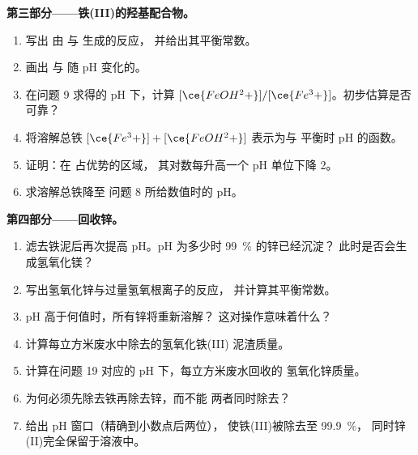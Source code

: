 \begin{problem}
\medskip
\noindent\textbf{第三部分——铁(III)的羟基配合物。}
\begin{enumerate}[resume]
  \item 写出  由  与  生成的反应，
        并给出其平衡常数。
  \item 画出  与  随 pH
        变化的。
  \item 在问题 9 求得的 pH 下，计算
        $[\ce{FeOH^2+}]/[\ce{Fe^3+}]$。初步估算是否可靠？
  \item 将溶解总铁 $[\ce{Fe^3+}] + [\ce{FeOH^2+}]$
        表示为与  平衡时 pH 的函数。
  \item 证明：在  占优势的区域，
        其对数每升高一个 pH 单位下降 2。
  \item 求溶解总铁降至
        问题 8 所给数值时的 pH。
\end{enumerate}

\medskip
\noindent\textbf{第四部分——回收锌。}
\begin{enumerate}[resume]
  \item 滤去铁泥后再次提高 pH。pH 为多少时
        \qty{99}{\percent} 的锌已经沉淀？
        此时是否会生成氢氧化镁？
  \item 写出氢氧化锌与过量氢氧根离子的反应，
        并计算其平衡常数。
  \item pH 高于何值时，所有锌将重新溶解？
        这对操作意味着什么？
  \item 计算每立方米废水中除去的氢氧化铁(III)
        泥渣质量。
  \item 计算在问题 19 对应的 pH 下，每立方米废水回收的
        氢氧化锌质量。
  \item 为何必须先除去铁再除去锌，而不能
        两者同时除去？
  \item 给出 pH 窗口（精确到小数点后两位），
        使铁(III)被除去至 \qty{99.9}{\percent}，
        同时锌(II)完全保留于溶液中。
\end{enumerate}
\end{problem}
